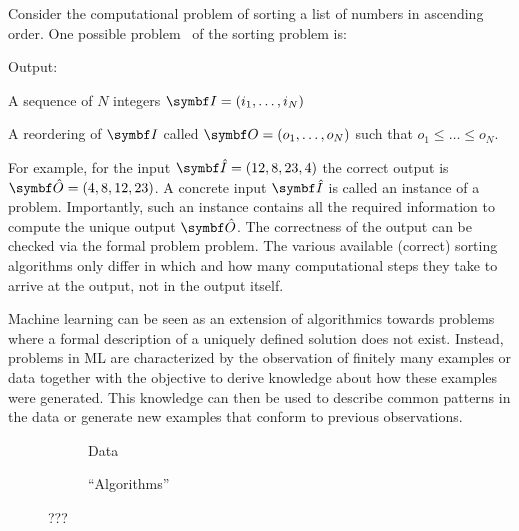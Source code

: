 Consider the computational problem of sorting a list of numbers in ascending order.
One possible problem~\parencite{cormen_introduction_2009} of the sorting problem is:
\begin{problem}[Sorting]
\label{prob:bayesian_ml:sorting}
\begin{labeling}{Output:}
    \item[Input:] A sequence of $N$ integers $\mat{I} = (i_1, \dots, i_N)$
    \item[Output:] A reordering of $\mat{I}$ called $\mat{O} = (o_1, \dots, o_N)$ such that $o_1 \leq \dots \leq o_N$.
\end{labeling}
\end{problem}
For example, for the input $\mat{\hat{I}}=(12, 8, 23, 4)$ the correct output is $\mat{\hat{O}}=(4, 8, 12, 23)$.
A concrete input $\mat{\hat{I}}$ is called an instance of a problem.
Importantly, such an instance contains all the required information to compute the unique output $\mat{\hat{O}}$.
The correctness of the output can be checked via the formal problem problem.
The various available (correct) sorting algorithms only differ in which and how many computational steps they take to arrive at the output, not in the output itself.

Machine learning can be seen as an extension of algorithmics towards problems where a formal description of a uniquely defined solution does not exist.
Instead, problems in ML are characterized by the observation of finitely many examples or data together with the objective to derive knowledge about how these examples were generated.
This knowledge can then be used to describe common patterns in the data or generate new examples that conform to previous observations.

\begin{figure}[t]
    \begin{subfigure}[b]{\halffigurewidth}
        \centering
        \caption{
            Data
            \label{fig:bayesian_ml:polynoms:data}
        }
    \end{subfigure}
    \hfill
    \begin{subfigure}[b]{\halffigurewidth}
        \centering
        \caption{
            \enquote{Algorithms}
            \label{fig:bayesian_ml:polynoms:lagrange}
        }
    \end{subfigure}
    \caption[Algorithmic Interpolation]{
        ???
        \label{fig:bayesian_ml:polynoms}
    }
\end{figure}

